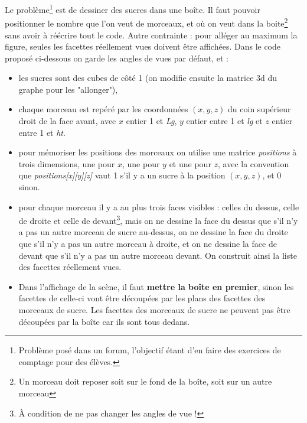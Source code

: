 Le problème\footnote{Problème posé dans un forum, l'objectif étant d'en faire des exercices de comptage pour des élèves.} est de dessiner des sucres dans une boîte. Il faut pouvoir positionner le nombre que l'on veut de morceaux, et où on veut dans la boite\footnote{Un morceau doit reposer soit sur le fond de la boîte, soit sur un autre morceau} sans avoir à réécrire tout le code. Autre contrainte : pour alléger au maximum la figure, seules les facettes réellement vues doivent être affichées. Dans le code proposé ci-dessous on garde les angles de vues par défaut, et :
\begin{itemize}
    \item les sucres sont des cubes de côté 1 (on modifie ensuite la matrice 3d du graphe pour les "allonger"),
    \item chaque morceau est repéré par les coordonnées $(x,y,z)$ du coin supérieur droit de la face avant, avec $x$ entier 1 et \emph{Lg}, $y$ entier entre 1 et \emph{lg} et $z$ entier entre 1 et \emph{ht}.
    \item pour mémoriser les positions des morceaux on utilise une matrice \emph{positions} à trois dimensions, une pour $x$, une pour $y$ et une pour $z$, avec la convention que \emph{positions[x][y][z]} vaut 1 s'il y a un sucre à la position $(x,y,z)$, et 0 sinon.
    \item pour chaque morceau il y a au plus trois faces visibles : celles du dessus, celle de droite et celle de devant\footnote{À condition de ne pas changer les angles de vue !}, mais on ne dessine la face du dessus que s'il n'y a pas un autre morceau de sucre au-dessus, on ne dessine la face du droite que s'il n'y a pas un autre morceau à droite, et on ne dessine la face de devant que s'il n'y a pas un autre morceau devant. On construit ainsi la liste des facettes réellement vues.
    \item Dans l'affichage de la scène, il faut \textbf{mettre la boîte en premier}, sinon les facettes de celle-ci vont être découpées par les plans des facettes des morceaux de sucre. Les facettes des morceaux de sucre ne peuvent pas être découpées par la boîte car ils sont tous dedans.
\end{itemize}

